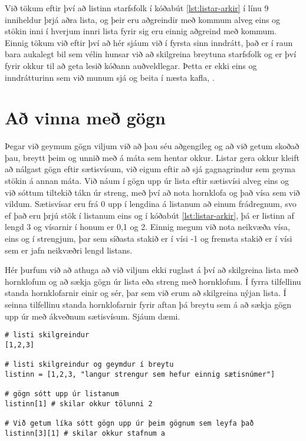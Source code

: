 Við tökum eftir því að listinn starfsfolk í kóðabút \ref{lst:listar-arkir} í línu 9 inniheldur þrjá aðra lista, og þeir eru aðgreindir með kommum alveg eins og stökin inni í hverjum innri lista fyrir sig eru einnig aðgreind með kommum.
Einnig tökum við eftir því að hér sjáum við í fyrsta sinn inndrátt, það er í raun bara aukalegt bil sem vélin hunsar við að skilgreina breytuna starfsfolk og er því fyrir okkur til að geta lesið kóðann auðveldlegar.
Þetta er ekki eins og inndrátturinn sem við munum sjá og beita í næsta kafla, .
 
\section{Að vinna með gögn}\label{uk:gagnavinnsla-listar}
Þegar við geymum gögn viljum við að þau séu aðgengileg og að við getum skoðað þau, breytt þeim og unnið með á máta sem hentar okkur.
Listar gera okkur kleift að nálgast gögn eftir sætisvísum, við eigum eftir að sjá gagnagrindur sem geyma stökin á annan máta.
Við náum í gögn upp úr lista eftir sætisvísi alveg eins og við sóttum tiltekið tákn úr streng, með því að nota hornklofa og það vísa sem við vildum.
Sætisvísar eru frá 0 upp í lengdina á listanum að einum frádregnum, svo ef það eru þrjú stök í listanum eins og í kóðabút \ref{lst:listar-arkir}, þá er listinn af lengd 3 og vísarnir í honum er 0,1 og 2.
Einnig megum við nota neikvæða vísa, eins og í strengjum, þar sem síðasta stakið er í vísi -1 og fremsta stakið er í vísi sem er jafn neikvæðri lengd listans.

Hér þurfum við að athuga að við viljum ekki ruglast á því að skilgreina lista með hornklofum og að sækja gögn úr lista eða streng með hornklofum.
Í fyrra tilfellinu standa hornklofarnir einir og sér, þar sem við erum að skilgreina nýjan lista.
Í seinna tilfellinu standa hornklofarnir fyrir aftan þá breytu sem á að sækja gögn upp úr með ákveðnum sætisvísum.
Sjáum dæmi.

\begin{lstlisting}[caption=Listar af listum, label=lst:listar-gogn-sott]
# listi skilgreindur
[1,2,3]

# listi skilgreindur og geymdur í breytu
listinn = [1,2,3, "langur strengur sem hefur einnig sætisnúmer"]

# gögn sótt upp úr listanum
listinn[1] # skilar okkur tölunni 2

# Við getum líka sótt gögn upp úr þeim gögnum sem leyfa það
listinn[3][1] # skilar okkur stafnum a
\end{lstlisting}

